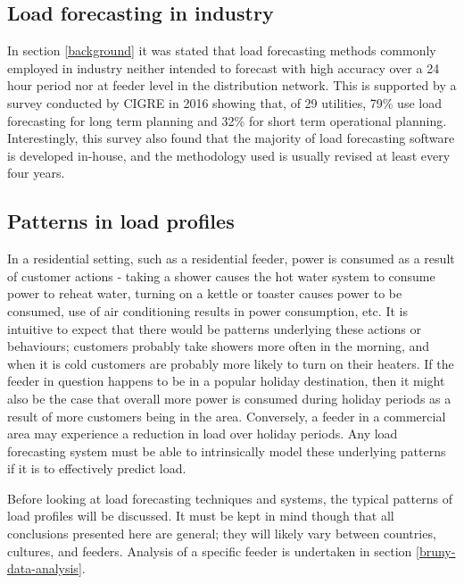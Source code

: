 \subsection{Load forecasting in industry}
In section \ref{background} it was stated that load forecasting methods commonly employed in industry neither intended to forecast with high accuracy over a 24 hour period nor at feeder level in the distribution network.
This is supported by a survey conducted by CIGRE in 2016 \citep{CIGRE2016} showing that, of 29 utilities, 79\% use load forecasting for long term planning and 32\% for short term operational planning.
Interestingly, this survey also found that the majority of load forecasting software is developed in-house, and the methodology used is usually revised at least every four years.


\subsection{Patterns in load profiles}
\label{patterns-profiles}
In a residential setting, such as a residential feeder, power is consumed as a result of customer actions - taking a shower causes the hot water system to consume power to reheat water, turning on a kettle or toaster causes power to be consumed, use of air conditioning results in power consumption, etc.
It is intuitive to expect that there would be patterns underlying these actions or behaviours; customers probably take showers more often in the morning, and when it is cold customers are probably more likely to turn on their heaters.
If the feeder in question happens to be in a popular holiday destination, then it might also be the case that overall more power is consumed during holiday periods as a result of more customers being in the area.
Conversely, a feeder in a commercial area may experience a reduction in load over holiday periods.
Any load forecasting system must be able to intrinsically model these underlying patterns if it is to effectively predict load.

Before looking at load forecasting techniques and systems, the typical patterns of load profiles will be discussed.
It must be kept in mind though that all conclusions presented here are general; they will likely vary between countries, cultures, and feeders.
Analysis of a specific feeder is undertaken in section \ref{bruny-data-analysis}.

